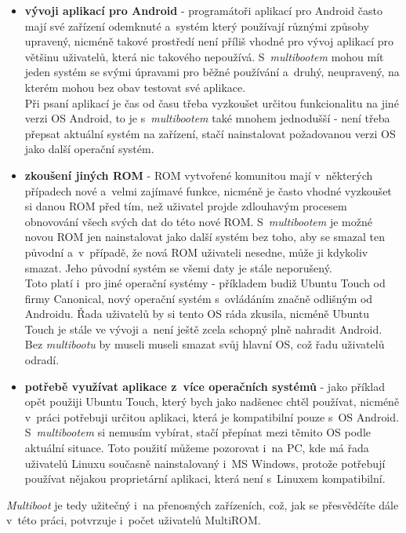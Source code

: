 \documentclass[12pt, a4paper, oneside]{article}
\newcommand{\B}{\textbf} %
\newcommand{\It}{\textit}  %
\begin{document}
\begin{itemize}
    \item \B{vývoji aplikací pro Android} - programátoři aplikací pro Android často mají své zařízení odemknuté a~systém který používají různými způsoby upravený, nicméně takové prostředí není příliš vhodné pro vývoj aplikací pro většinu uživatelů, která nic takového nepoužívá. S~\It{multibootem} mohou mít jeden systém se svými úpravami pro běžné používání a~druhý, neupravený, na kterém mohou bez obav testovat své aplikace. \\
    Při psaní aplikací je čas od času třeba vyzkoušet určitou funkcionalitu na jiné verzi OS Android, to je s~\It{multibootem} také mnohem jednodušší - není třeba přepsat aktuální systém na zařízení, stačí nainstalovat požadovanou verzi OS jako další operační systém.

    \item \B{zkoušení jiných ROM} - ROM vytvořené komunitou mají v~některých případech nové a~velmi zajímavé funkce, nicméně je často vhodné vyzkoušet si danou ROM před tím, než uživatel projde zdlouhavým procesem obnovování všech svých dat do této nové ROM. S~\It{multibootem} je možné novou ROM jen nainstalovat jako další systém bez toho, aby se smazal ten původní a~v~případě, že nová ROM uživateli nesedne, může ji kdykoliv smazat. Jeho původní systém se všemi daty je stále neporušený.\\
    Toto platí i~pro jiné operační systémy - příkladem budiž Ubuntu Touch od firmy Canonical, nový operační systém s~ovládáním značně odlišným od Androidu. Řada uživatelů by si tento OS ráda zkusila, nicméně Ubuntu Touch je stále ve vývoji a~není ještě zcela schopný plně nahradit Android. Bez \It{multibootu} by museli museli smazat svůj hlavní OS, což řadu uživatelů odradí.

    \item \B{potřebě využívat aplikace z~více operačních systémů} - jako příklad opět použiji Ubuntu Touch, který bych jako nadšenec chtěl používat, nicméně v~práci potřebuji určitou aplikaci, která je kompatibilní pouze s~OS Android. S~\It{multibootem} si nemusím vybírat, stačí přepínat mezi těmito OS podle aktuální situace. Toto použití můžeme pozorovat i~na PC, kde má řada uživatelů Linuxu současně nainstalovaný i~MS Windows, protože potřebují používat nějakou proprietární aplikaci, která není s~Linuxem kompatibilní.
\end{itemize}

\noindent \It{Multiboot} je tedy užitečný i~na přenosných zařízeních, což, jak se přesvědčíte dále v~této práci, potvrzuje i~počet uživatelů MultiROM.
\end{document}

